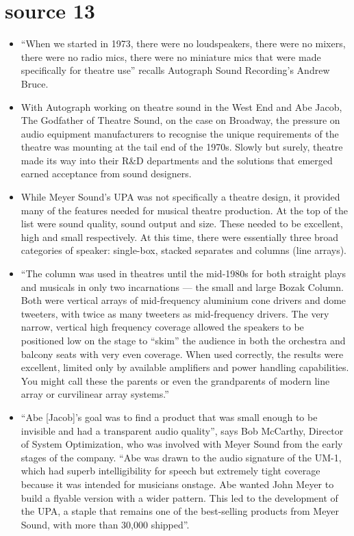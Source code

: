 \documentclass[12pt]{article}
\begin{document}
    \section{source 13 \autocite{TheatricalAddressLoudspeakers}}
        \begin{itemize}
            \item ``When we started in 1973, there were no loudspeakers, there were no mixers, there were no radio mics, there were no miniature mics that were made specifically for theatre use'' recalls Autograph Sound Recording's Andrew Bruce.
            \item With Autograph working on theatre sound in the West End and Abe Jacob, The Godfather of Theatre Sound, on the case on Broadway, the pressure on audio equipment manufacturers to recognise the unique requirements of the theatre was mounting at the tail end of the 1970s. Slowly but surely, theatre made its way into their R\x   &D departments and the solutions that emerged earned acceptance from sound designers.
            \item While Meyer Sound's UPA was not specifically a theatre design, it provided many of the features needed for musical theatre production. At the top of the list were sound quality, sound output and size. These needed to be excellent, high and small respectively. At this time, there were essentially three broad categories of speaker: single-box, stacked separates and columns (line arrays).
            \item ``The column was used in theatres until the mid-1980s for both straight plays and musicals in only two incarnations --- the small and large Bozak Column. Both were vertical arrays of mid-frequency aluminium cone drivers and dome tweeters, with twice as many tweeters as mid-frequency drivers. The very narrow, vertical high frequency coverage allowed the speakers to be positioned low on the stage to “skim” the audience in both the orchestra and balcony seats with very even coverage. When used correctly, the results were excellent, limited only by available amplifiers and power handling capabilities. You might call these the parents or even the grandparents of modern line array or curvilinear array systems.''
            \item ``Abe [Jacob]'s goal was to find a product that was small enough to be invisible and had a transparent audio quality'', says Bob McCarthy, Director of System Optimization, who was involved with Meyer Sound from the early stages of the company. ``Abe was drawn to the audio signature of the UM-1, which had superb intelligibility for speech but extremely tight coverage because it was intended for musicians onstage. Abe wanted John Meyer to build a flyable version with a wider pattern. This led to the development of the UPA, a staple that remains one of the best-selling products from Meyer Sound, with more than 30,000 shipped''.

\end{itemize}
\end{document}
